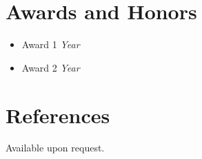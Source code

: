 \documentclass[11pt,a4paper]{article}
\begin{document}
\section{Awards and Honors}
\begin{itemize}
    \item[] Award 1 \hfill \textit{Year}
    \item[] Award 2 \hfill \textit{Year}
\end{itemize}

\section{References}
Available upon request.
\end{document}
